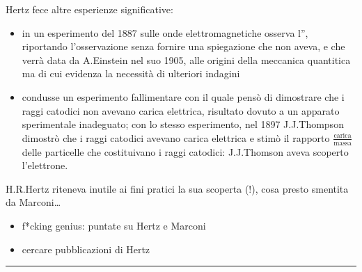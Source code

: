\documentclass[letterpaper,10pt,italian]{jupyterBook}
\begin{document}
\sphinxAtStartPar
{} 

\sphinxAtStartPar
Hertz fece altre esperienze significative:
\begin{itemize}
\item {} 
\sphinxAtStartPar
in un esperimento del 1887 sulle onde elettromagnetiche osserva l”, riportando l’osservazione senza fornire una spiegazione \sphinxhyphen{} che non aveva, e che verrà data da A.Einstein nel suo  1905, alle origini della meccanica quantitica \sphinxhyphen{} ma di cui evidenza la necessità di ulteriori indagini

\item {} 
\sphinxAtStartPar
condusse un esperimento fallimentare con il quale pensò di dimostrare che i raggi catodici non avevano carica elettrica, risultato dovuto a un apparato sperimentale inadeguato; con lo stesso esperimento, nel 1897 J.J.Thompson dimostrò che i raggi catodici avevano carica elettrica e stimò il rapporto \(\frac{\text{carica}}{\text{massa}}\) delle particelle che costituivano i raggi catodici: J.J.Thomson aveva scoperto l’elettrone.

\end{itemize}

\sphinxAtStartPar
{}  H.R.Hertz riteneva inutile ai fini pratici la sua scoperta (!), cosa presto smentita da Marconi…

\sphinxAtStartPar
{}  

\sphinxAtStartPar
{}
\begin{itemize}
\item {} 
\sphinxAtStartPar
f*cking genius: puntate su Hertz e Marconi

\item {} 
\sphinxAtStartPar
cercare pubblicazioni di Hertz

\end{itemize}


\bigskip\hrule\bigskip


\sphinxstepscope
\end{document}
